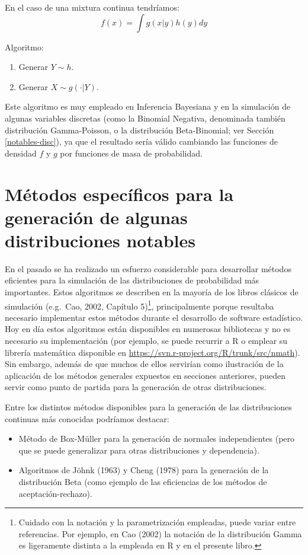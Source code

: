 \documentclass[
]{book}
\theoremstyle{break}
\theoremstyle{definition}
\theoremstyle{definition}
\theoremstyle{definition}
\theoremstyle{definition}
\theoremstyle{remark}
\begin{document}
En el caso de una mixtura continua tendríamos:
\[f(x)=\int g(x|y)h(y)dy\]

Algoritmo:

\begin{enumerate}
\def\labelenumi{\arabic{enumi}.}
\item
  Generar \(Y\sim h\).
\item
  Generar \(X\sim g(\cdot |Y)\).
\end{enumerate}

Este algoritmo es muy empleado en Inferencia Bayesiana y en la simulación de algunas variables discretas (como la Binomial Negativa, denominada también distribución Gamma-Poisson, o la distribución Beta-Binomial; ver Sección \ref{notables-disc}),
ya que el resultado sería válido cambiando las funciones de densidad \(f\) y \(g\) por funciones de masa de probabilidad.

\hypertarget{notables-cont}{%
\section{Métodos específicos para la generación de algunas distribuciones notables}\label{notables-cont}}

En el pasado se ha realizado un esfuerzo considerable para desarrollar métodos eficientes para la simulación de las distribuciones de probabilidad más importantes.
Estos algoritmos se describen en la mayoría de los libros clásicos de simulación (e.g.~Cao, 2002, Capítulo 5)\footnote{Cuidado con la notación y la parametrización empleadas, puede variar entre referencias. Por ejemplo, en Cao (2002) la notación de la distribución Gamma es ligeramente distinta a la empleada en R y en el presente libro.}, principalmente porque resultaba necesario implementar estos métodos durante el desarrollo de software estadístico.
Hoy en día estos algoritmos están disponibles en numerosas bibliotecas y no es necesario su implementación (por ejemplo, se puede recurrir a R o emplear su librería matemática disponible en \url{https://svn.r-project.org/R/trunk/src/nmath}).
Sin embargo, además de que muchos de ellos servirían como ilustración de la aplicación de los métodos generales expuestos en secciones anteriores, pueden servir como punto de partida para la generación de otras distribuciones.

Entre los distintos métodos disponibles para la generación de las distribuciones continuas más conocidas podríamos destacar:

\begin{itemize}
\item
  Método de Box-Müller para la generación de normales independientes (pero que se puede generalizar para otras distribuciones y dependencia).
\item
  Algoritmos de Jöhnk (1963) y Cheng (1978) para la generación de la distribución Beta (como ejemplo de las eficiencias de los métodos de aceptación-rechazo).
\end{itemize}
\end{document}
